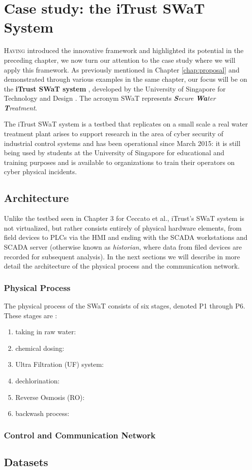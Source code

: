 \chapter{Case study: the iTrust SWaT System}
\label{casestudy}

\linenumbers
\lettrine[lines=2]{H}{aving} introduced the innovative framework and highlighted its potential in the preceding chapter, we now turn our attention to the case study where we will apply this framework. As previously mentioned in Chapter \ref{chap:proposal} and demonstrated through various examples in the same chapter, our focus will be on the \textbf{iTrust SWaT system} \cite{swat_home}, developed by the University of Singapore for Technology and Design \cite{itrust_site}. The acronym SWaT represents \textit{\textbf{S}ecure \textbf{Wa}ter \textbf{T}reatment}.

\bigskip
The iTrust SWaT system is a testbed that replicates on a small scale a real water treatment plant arises to support research in the area of cyber security of industrial control systems and has been operational since March 2015: it is still being used by students at the University of Singapore for educational and training purposes and is available to organizations to train their operators on cyber physical incidents.

\section{Architecture}
\label{sec:5_swat_architecture}
Unlike the testbed seen in Chapter 3 for Ceccato et al., iTrust's SWaT system is not virtualized, but rather consists entirely of physical hardware elements, from field devices to PLCs via the HMI and ending with the SCADA workstations and SCADA server (otherwise known as \textit{historian}, where data from filed devices are recorded for subsequent analysis).\newline
In the next sections we will describe in more detail the architecture of the physical process and the communication network.

\subsection{Physical Process} 
\label{subsec:5_swat_physical_architecture}
The physical process of the SWaT consists of six stages, denoted P1 through P6. These stages are \cite{swat_tecnical_pdf}:

\begin{enumerate}
	\item taking in raw water: 
	\item chemical dosing:
	\item Ultra Filtration (UF) system:
	\item dechlorination:
	\item Reverse Osmosis (RO):
	\item backwash process:
\end{enumerate}

\subsection{Control and Communication Network}
\label{subsec:5_swat_network_architecture}

\section{Datasets}
\label{sec:5_swat_datasets}


\vfill
\nolinenumbers